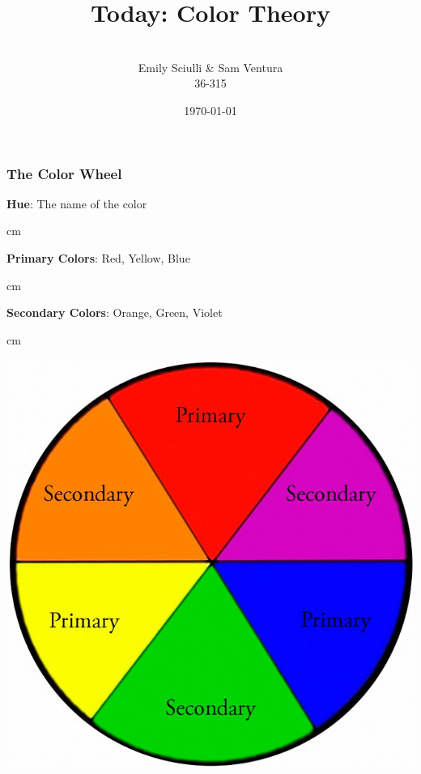 \documentclass{beamer} %
\begin{document}
\title[dedup]{Today:  Color Theory}


\author[Samuel L. Ventura]{\\
  \large{Emily Sciulli \& Sam Ventura\\36-315}}
\date{\today}


\begin{frame}
	\maketitle

	
\end{frame}




\begin{frame}\frametitle{The Color Wheel}
	\centering
	
	\textbf{Hue}:  The name of the color
	
	 cm
	
	\textbf{Primary Colors}:  Red, Yellow, Blue
	
	 cm
	
	\textbf{Secondary Colors}:  Orange, Green, Violet
	
	 cm
	
	\includegraphics[width=0.55\linewidth]{colorwheel}
	
\end{frame}
\end{document}
